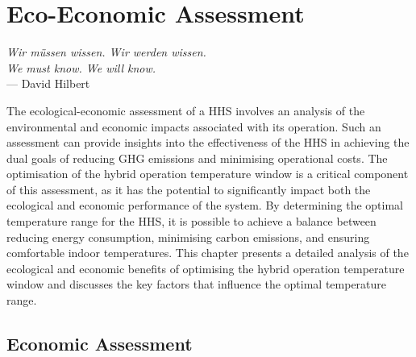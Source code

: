 \chapter{Eco-Economic Assessment}\label{ch:eco-ecoass} 

\begin{flushright}{\slshape
    Wir m\"ussen wissen. Wir werden wissen.} \\ 
    \textit{We must know. We will know.}\\\medskip
    --- David Hilbert
\end{flushright}

The ecological-economic assessment of a \ac{HHS} involves an analysis of the environmental and economic impacts associated with its operation. Such an assessment can provide insights into the effectiveness of the \ac{HHS} in achieving the dual goals of reducing \ac{GHG} emissions and minimising operational costs. The optimisation of the hybrid operation temperature window is a critical component of this assessment, as it has the potential to significantly impact both the ecological and economic performance of the system. By determining the optimal temperature range for the \ac{HHS}, it is possible to achieve a balance between reducing energy consumption, minimising carbon emissions, and ensuring comfortable indoor temperatures. This chapter presents a detailed analysis of the ecological and economic benefits of optimising the hybrid operation temperature window and discusses the key factors that influence the optimal temperature range.

\section{Economic Assessment} \label{sec:ecoass}

